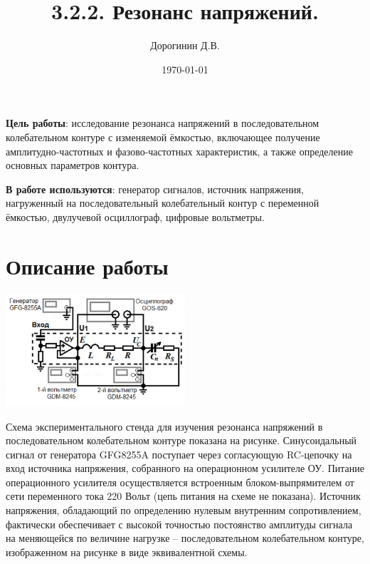 \documentclass[a4paper,12pt]{article}
\author{Дорогинин Д.В.}
\title{3.2.2. Резонанс напряжений.}
\date{\today}
\begin{document}
\maketitle
\newpage
\textbf{Цель работы}: исследование резонанса напряжений в последовательном колебательном контуре с изменяемой ёмкостью, включающее получение амплитудно-частотных и фазово-частотных характеристик, а также определение основных параметров контура.


\textbf{В работе используются}: генератор сигналов, источник напряжения, нагруженный на последовательный колебательный контур с переменной ёмкостью, двулучевой осциллограф, цифровые вольтметры.
\section*{Описание работы}
\begin{center}
\includegraphics[width = 0.5\textwidth]{2.png}
\end{center}
Схема экспериментального стенда для изучения резонанса напряжений в последовательном колебательном контуре показана на рисунке. Синусоидальный сигнал от генератора GFG8255A поступает через согласующую RC-цепочку на вход источника напряжения, собранного на операционном усилителе ОУ. Питание операционного усилителя осуществляется
встроенным блоком-выпрямителем от сети переменного тока 220 Вольт (цепь питания на
схеме не показана). Источник напряжения, обладающий по определению нулевым внутренним сопротивлением, фактически обеспечивает с высокой точностью постоянство амплитуды сигнала на меняющейся по величине нагрузке – последовательном колебательном контуре, изображенном на рисунке в виде эквивалентной схемы.
\end{document}
